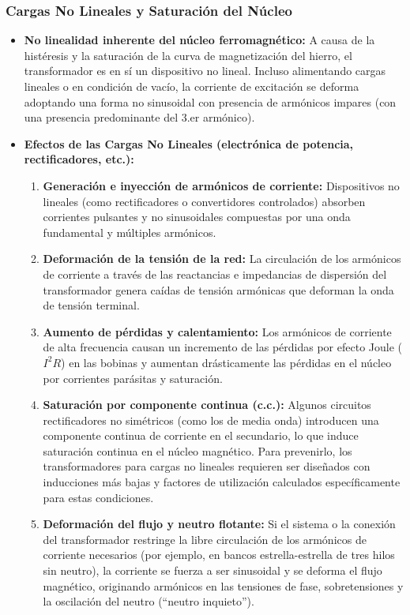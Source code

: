 \documentclass[12pt]{article}
\begin{document}
\subsubsection*{Cargas No Lineales y Saturaci\'on del N\'ucleo}
\begin{itemize}
    \item \textbf{No linealidad inherente del n\'ucleo ferromagn\'etico:} A causa de la hist\'eresis y la saturaci\'on de la curva de magnetizaci\'on del hierro, el transformador es en s\'i un dispositivo no lineal. Incluso alimentando cargas lineales o en condici\'on de vac\'io, la corriente de excitaci\'on se deforma adoptando una forma no sinusoidal con presencia de arm\'onicos impares (con una presencia predominante del 3.er arm\'onico).

    \item \textbf{Efectos de las Cargas No Lineales (electr\'onica de potencia, rectificadores, etc.):}
    \begin{enumerate}
        \item \textbf{Generaci\'on e inyecci\'on de arm\'onicos de corriente:} Dispositivos no lineales (como rectificadores o convertidores controlados) absorben corrientes pulsantes y no sinusoidales compuestas por una onda fundamental y m\'ultiples arm\'onicos.

        \item \textbf{Deformaci\'on de la tensi\'on de la red:} La circulaci\'on de los arm\'onicos de corriente a trav\'es de las reactancias e impedancias de dispersi\'on del transformador genera ca\'idas de tensi\'on arm\'onicas que deforman la onda de tensi\'on terminal.

        \item \textbf{Aumento de p\'erdidas y calentamiento:} Los arm\'onicos de corriente de alta frecuencia causan un incremento de las p\'erdidas por efecto Joule ($I^2R$) en las bobinas y aumentan dr\'asticamente las p\'erdidas en el n\'ucleo por corrientes par\'asitas y saturaci\'on.

        \item \textbf{Saturaci\'on por componente continua (c.c.):} Algunos circuitos rectificadores no sim\'etricos (como los de media onda) introducen una componente continua de corriente en el secundario, lo que induce saturaci\'on continua en el n\'ucleo magn\'etico. Para prevenirlo, los transformadores para cargas no lineales requieren ser dise\~nados con inducciones m\'as bajas y factores de utilizaci\'on calculados espec\'ificamente para estas condiciones.

        \item \textbf{Deformaci\'on del flujo y neutro flotante:} Si el sistema o la conexi\'on del transformador restringe la libre circulaci\'on de los arm\'onicos de corriente necesarios (por ejemplo, en bancos estrella-estrella de tres hilos sin neutro), la corriente se fuerza a ser sinusoidal y se deforma el flujo magn\'etico, originando arm\'onicos en las tensiones de fase, sobretensiones y la oscilaci\'on del neutro (``neutro inquieto'').
    \end{enumerate}
\end{itemize}
\end{document}
